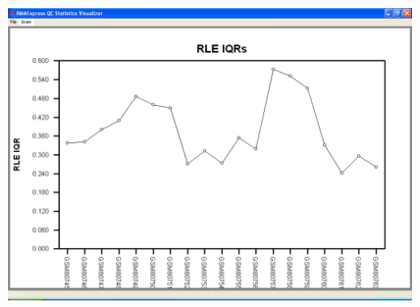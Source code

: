 \documentclass[11pt]{report}
\begin{document}
\begin{center}
\includegraphics[scale=0.4]{RLEIQRs.png}\\
\end{center}
\end{document}
